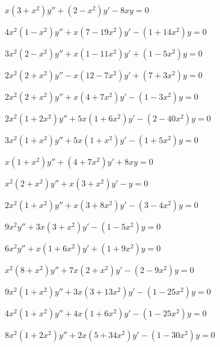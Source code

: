 \begin{exerciselist}
  \item\label{exer:7.5.36} $x(3+x^{2})y''+(2-x^{2})y'-8xy=0$

  \item\label{exer:7.5.37} $4x^{2}(1-x^{2})y''+x(7-19x^{2})y'-(1+14x^{2})y=0$

  \item\label{exer:7.5.38} $3x^{2}(2-x^{2})y''+x(1-11x^{2})y'+(1-5x^{2})y=0$

  \item\label{exer:7.5.39} $2x^{2}(2+x^{2})y''-x(12-7x^{2})y'+(7+3x^{2})y=0$

  \item\label{exer:7.5.40} $2x^{2}(2+x^{2})y''+x(4+7x^{2})y'-(1-3x^{2})y=0$

  \item\label{exer:7.5.41} $2x^{2}(1+2x^{2})y''+5x(1+6x^{2})y'-(2-40x^{2})y=0$

  \item\label{exer:7.5.42} $3x^{2}(1+x^{2})y''+5x(1+x^{2})y'-(1+5x^{2})y=0$

  \item\label{exer:7.5.43} $x(1+x^{2})y''+(4+7x^{2})y'+8xy=0$

  \item\label{exer:7.5.44} $x^{2}(2+x^{2})y''+x(3+x^{2})y'-y=0$

  \item\label{exer:7.5.45} $2x^{2}(1+x^{2})y''+x(3+8x^{2})y'-(3-4x^{2})y=0$

  \item\label{exer:7.5.46} $9x^{2}y''+3x(3+x^{2})y'-(1-5x^{2})y=0$


  \item\label{exer:7.5.47} \Cex $6x^{2}y''+x(1+6x^{2})y'+(1+9x^{2})y=0$

  \item\label{exer:7.5.48} \Cex $x^{2}(8+x^{2})y''+7x(2+x^{2})y'-(2-9x^{2})y=0$

  \item\label{exer:7.5.49} \Cex $9x^{2}(1+x^{2})y''+3x(3+13x^{2})y'-(1-25x^{2})y=0$

  \item\label{exer:7.5.50} \Cex $4x^{2}(1+x^{2})y''+4x(1+6x^{2})y'-(1-25x^{2})y=0$

  \item\label{exer:7.5.51} \Cex $8x^{2}(1+2x^{2})y''+2x(5+34x^{2})y'-(1-30x^{2})y=0$


\end{exerciselist}
